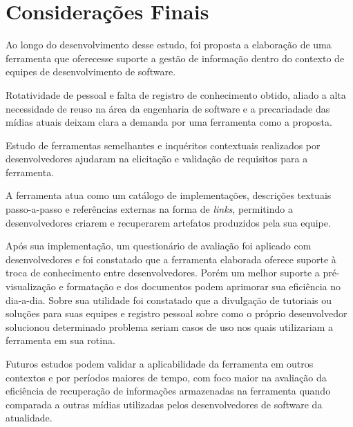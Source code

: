 \chapter{Considerações Finais}

Ao longo do desenvolvimento desse estudo, foi proposta a elaboração de uma ferramenta que oferecesse suporte a gestão de informação dentro do contexto de equipes de desenvolvimento de software.

Rotatividade de pessoal e falta de registro de conhecimento obtido, aliado a alta necessidade de reuso na área da engenharia de software e a precariadade das mídias atuais deixam clara a demanda por uma ferramenta como a proposta.

Estudo de ferramentas semelhantes e inquéritos contextuais realizados por desenvolvedores ajudaram na elicitação e validação de requisitos para a ferramenta.

A ferramenta atua como um catálogo de implementações, descrições textuais passo-a-passo e referências externas na forma de \textit{links}, permitindo a desenvolvedores criarem e recuperarem artefatos produzidos pela sua equipe.

Após sua implementação, um questionário de avaliação foi aplicado com desenvolvedores e foi constatado que a ferramenta elaborada oferece suporte à troca de conhecimento entre desenvolvedores. Porém um melhor suporte a pré-visualização e formatação e dos documentos podem aprimorar sua eficiência no dia-a-dia. Sobre sua utilidade foi constatado que a divulgação de tutoriais ou soluções para suas equipes e registro pessoal sobre como o próprio desenvolvedor solucionou determinado problema seriam casos de uso nos quais utilizariam a ferramenta em sua rotina.

Futuros estudos podem validar a aplicabilidade da ferramenta em outros contextos e por períodos maiores de tempo, com foco maior na avaliação da eficiência de recuperação de informações armazenadas na ferramenta quando comparada a outras mídias utilizadas pelos desenvolvedores de software da atualidade.
